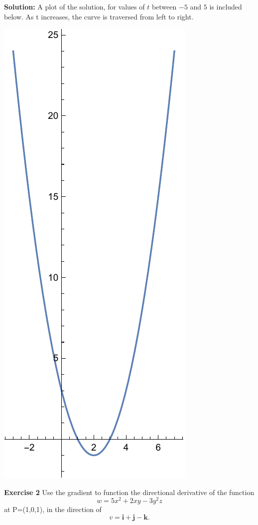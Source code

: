 \documentclass[12pt,oneside]{exam}
\newenvironment{exercise}[1]{\vspace{.1in}\noindent\textbf{Exercise #1 \hspace{.05em}}}{}
\newenvironment{newsolution}{\vspace{.1in}\noindent\textbf{Solution: \hspace{.05em}}}{}
\begin{document}
\begin{newsolution} 
A plot of the solution, for values of $t$ between $-5$ and $5$ is included below. As t increases, the curve is traversed from left to right. 
\begin{center}
\includegraphics[scale=0.5]{p1.pdf}
\end{center}
\end{newsolution}

\begin{exercise}{2}
Use the gradient to function the directional derivative of the function
\begin{equation*}
w = 5x^2 + 2xy -3y^2z
\end{equation*}
at P=(1,0,1), in the direction of
\begin{equation*}
v = \mathbf{i} + \mathbf{j} - \mathbf{k}.
\end{equation*}
\end{exercise}
\end{document}
